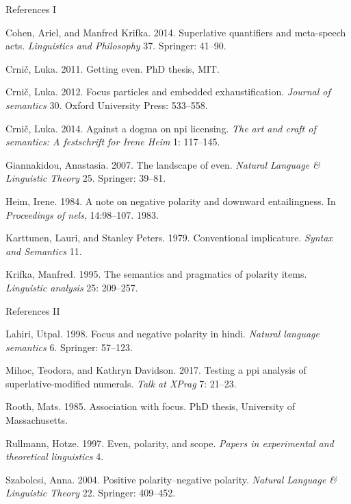 \documentclass[ignorenonframetext,]{beamer}
\begin{document}
\begin{frame}{References I}

\scriptsize

\hypertarget{refs}{}
\hypertarget{ref-cohen2014superlative}{}
Cohen, Ariel, and Manfred Krifka. 2014. Superlative quantifiers and
meta-speech acts. \emph{Linguistics and Philosophy} 37. Springer:
41--90.

\hypertarget{ref-crnic2011getting}{}
Crnič, Luka. 2011. Getting even. PhD thesis, MIT.

\hypertarget{ref-crnivc2012focus}{}
Crnič, Luka. 2012. Focus particles and embedded exhaustification.
\emph{Journal of semantics} 30. Oxford University Press: 533--558.

\hypertarget{ref-crnivc2014against}{}
Crnič, Luka. 2014. Against a dogma on npi licensing. \emph{The art and
craft of semantics: A festschrift for Irene Heim} 1: 117--145.

\hypertarget{ref-giannakidou2007landscape}{}
Giannakidou, Anastasia. 2007. The landscape of even. \emph{Natural
Language \& Linguistic Theory} 25. Springer: 39--81.

\hypertarget{ref-heim1984note}{}
Heim, Irene. 1984. A note on negative polarity and downward
entailingness. In \emph{Proceedings of nels}, 14:98--107. 1983.

\hypertarget{ref-KarttunenPeters:1979}{}
Karttunen, Lauri, and Stanley Peters. 1979. Conventional implicature.
\emph{Syntax and Semantics} 11.

\hypertarget{ref-krifka1995semantics}{}
Krifka, Manfred. 1995. The semantics and pragmatics of polarity items.
\emph{Linguistic analysis} 25: 209--257.


\end{frame}

\begin{frame}{References II}

\scriptsize

\hypertarget{ref-lahiri1998focus}{}
Lahiri, Utpal. 1998. Focus and negative polarity in hindi. \emph{Natural
language semantics} 6. Springer: 57--123.

\hypertarget{ref-mihoc2017testing}{}
Mihoc, Teodora, and Kathryn Davidson. 2017. Testing a ppi analysis of
superlative-modified numerals. \emph{Talk at XPrag} 7: 21--23.

\hypertarget{ref-Rooth:1985}{}
Rooth, Mats. 1985. Association with focus. PhD thesis, University of
Massachusetts.

\hypertarget{ref-rullmann1997even}{}
Rullmann, Hotze. 1997. Even, polarity, and scope. \emph{Papers in
experimental and theoretical linguistics} 4.

\hypertarget{ref-szabolcsi2004positive}{}
Szabolcsi, Anna. 2004. Positive polarity--negative polarity.
\emph{Natural Language \& Linguistic Theory} 22. Springer: 409--452.


\end{frame}
\end{document}
